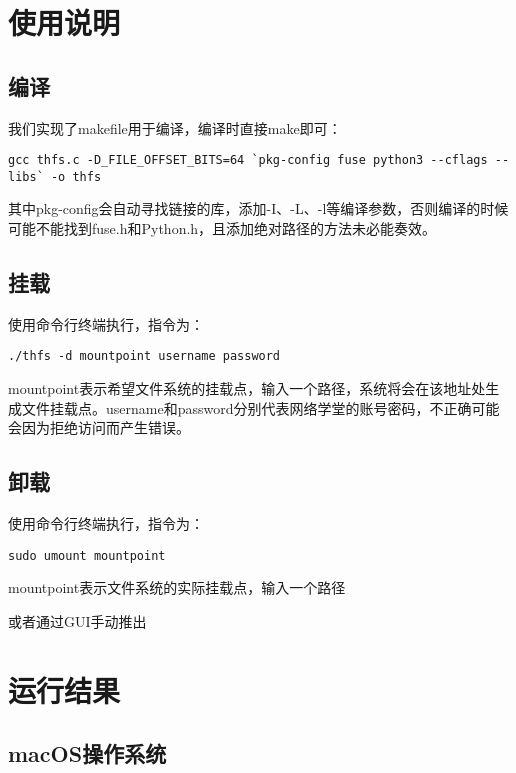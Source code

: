 \section{使用说明}

\subsection{编译}
我们实现了makefile用于编译，编译时直接make即可：
\begin{lstlisting}
gcc thfs.c -D_FILE_OFFSET_BITS=64 `pkg-config fuse python3 --cflags --libs` -o thfs
\end{lstlisting}
其中pkg-config会自动寻找链接的库，添加-I、-L、-l等编译参数，否则编译的时候可能不能找到fuse.h和Python.h，且添加绝对路径的方法未必能奏效。

\subsection{挂载}
使用命令行终端执行，指令为：

\begin{lstlisting}
./thfs -d mountpoint username password
\end{lstlisting}

mountpoint表示希望文件系统的挂载点，输入一个路径，系统将会在该地址处生成文件挂载点。username和password分别代表网络学堂的账号密码，不正确可能会因为拒绝访问而产生错误。

\subsection{卸载}

使用命令行终端执行，指令为：

\begin{lstlisting}
sudo umount mountpoint
\end{lstlisting}
mountpoint表示文件系统的实际挂载点，输入一个路径

或者通过GUI手动推出


\section{运行结果}

\subsection{macOS操作系统}



